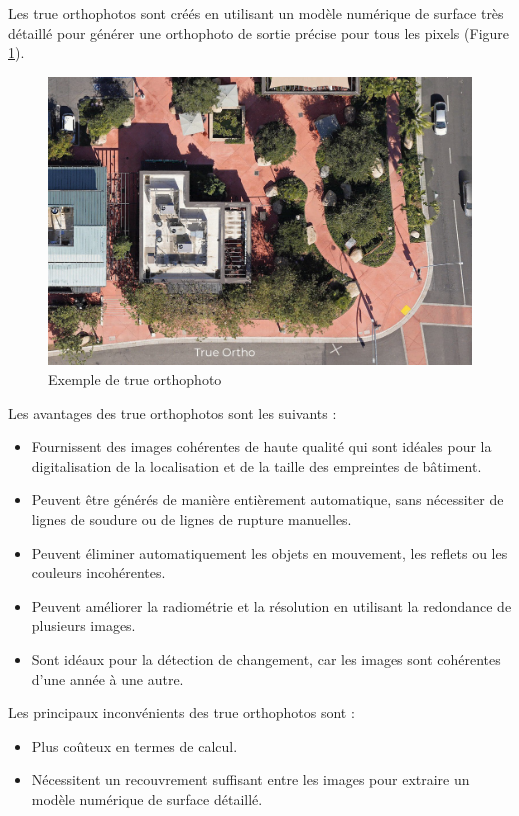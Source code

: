 Les true orthophotos sont créés en utilisant un modèle numérique de surface très détaillé pour générer une orthophoto de sortie précise pour tous les pixels (Figure \ref{fig:A1_14_true_orthophoto}).

\begin{figure}[H]
    \centering
    \includegraphics[width=1\linewidth]{03-tail//A1_fondamentaux_ML//A1_figures/A1_14_true_orthophoto.png}
    \caption{Exemple de true orthophoto \cite{barrette_different_2022}}
    \label{fig:A1_14_true_orthophoto}
\end{figure}

Les avantages des true orthophotos sont les suivants :
\begin{itemize}
    \item Fournissent des images cohérentes de haute qualité qui sont idéales pour la digitalisation de la localisation et de la taille des empreintes de bâtiment.
    \item Peuvent être générés de manière entièrement automatique, sans nécessiter de lignes de soudure ou de lignes de rupture manuelles.
    \item Peuvent éliminer automatiquement les objets en mouvement, les reflets ou les couleurs incohérentes.
    \item Peuvent améliorer la radiométrie et la résolution en utilisant la redondance de plusieurs images.
    \item Sont idéaux pour la détection de changement, car les images sont cohérentes d'une année à une autre.
\end{itemize}

Les principaux inconvénients des true orthophotos sont :
\begin{itemize}
    \item Plus coûteux en termes de calcul.
    \item Nécessitent un recouvrement suffisant entre les images pour extraire un modèle numérique de surface détaillé.
\end{itemize}

